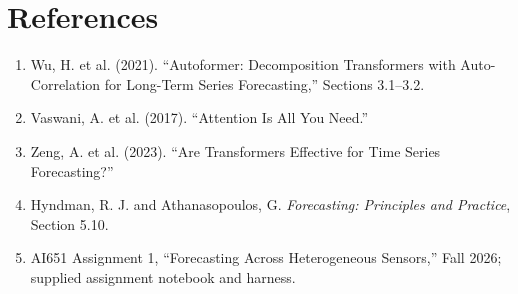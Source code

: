 \documentclass[11pt,a4paper]{article}
\begin{document}
\section*{References}

\begin{enumerate}[leftmargin=*]
  \item Wu, H. et al. (2021). ``Autoformer: Decomposition Transformers with Auto-Correlation
  for Long-Term Series Forecasting,'' Sections 3.1--3.2.
  \item Vaswani, A. et al. (2017). ``Attention Is All You Need.''
  \item Zeng, A. et al. (2023). ``Are Transformers Effective for Time Series Forecasting?''
  \item Hyndman, R. J. and Athanasopoulos, G. \textit{Forecasting: Principles and Practice},
  Section 5.10.
  \item AI651 Assignment 1, ``Forecasting Across Heterogeneous Sensors,'' Fall 2026; supplied
  assignment notebook and harness.
\end{enumerate}
\end{document}
